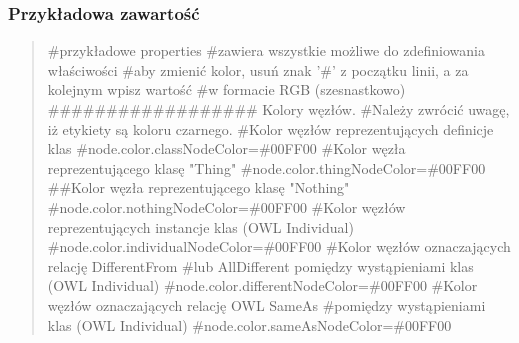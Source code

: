 \subsubsection{Przykładowa zawartość}
\begin{quote}

\#przykładowe properties \newline
\#zawiera wszystkie możliwe do zdefiniowania właściwości \newline
\#aby zmienić kolor, usuń znak '\#' z początku linii, a za kolejnym wpisz wartość \newline
\#w formacie RGB (szesnastkowo) \newline
 \newline
\#\#\#\#\#\#\#\#\#\#\#\#\#\#\#\#\#\# Kolory węzłów. \newline
\#Należy zwrócić uwagę, iż etykiety są koloru czarnego. \newline
 \newline
\#Kolor węzłów reprezentujących definicje klas \newline
\#node.color.classNodeColor=\#00FF00 \newline
 \newline
\#Kolor węzła reprezentującego klasę "Thing" \newline
\#node.color.thingNodeColor=\#00FF00 \newline
 \newline
\#\#Kolor węzła reprezentującego klasę "Nothing" \newline
\#node.color.nothingNodeColor=\#00FF00 \newline
 \newline
\#Kolor węzłów reprezentujących instancje klas (OWL Individual) \newline
\#node.color.individualNodeColor=\#00FF00 \newline
 \newline
\#Kolor węzłów oznaczających relację DifferentFrom \newline
\#lub AllDifferent pomiędzy wystąpieniami klas (OWL Individual) \newline
\#node.color.differentNodeColor=\#00FF00 \newline
 \newline
\#Kolor węzłów oznaczających relację OWL SameAs \newline
\#pomiędzy wystąpieniami klas (OWL Individual) \newline
\#node.color.sameAsNodeColor=\#00FF00 \newline
 \newline

\end{quote}
